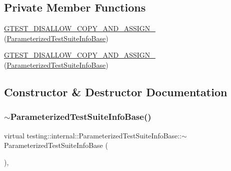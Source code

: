 \subsection*{Private Member Functions}
\begin{DoxyCompactItemize}
\item 
\mbox{\hyperlink{classtesting_1_1internal_1_1_parameterized_test_suite_info_base_a49431b7df609223c2a7fea67367e1d00}{G\+T\+E\+S\+T\+\_\+\+D\+I\+S\+A\+L\+L\+O\+W\+\_\+\+C\+O\+P\+Y\+\_\+\+A\+N\+D\+\_\+\+A\+S\+S\+I\+G\+N\+\_\+}} (\mbox{\hyperlink{classtesting_1_1internal_1_1_parameterized_test_suite_info_base}{Parameterized\+Test\+Suite\+Info\+Base}})
\item 
\mbox{\hyperlink{classtesting_1_1internal_1_1_parameterized_test_suite_info_base_a49431b7df609223c2a7fea67367e1d00}{G\+T\+E\+S\+T\+\_\+\+D\+I\+S\+A\+L\+L\+O\+W\+\_\+\+C\+O\+P\+Y\+\_\+\+A\+N\+D\+\_\+\+A\+S\+S\+I\+G\+N\+\_\+}} (\mbox{\hyperlink{classtesting_1_1internal_1_1_parameterized_test_suite_info_base}{Parameterized\+Test\+Suite\+Info\+Base}})
\end{DoxyCompactItemize}


\subsection{Constructor \& Destructor Documentation}
\mbox{\label{classtesting_1_1internal_1_1_parameterized_test_suite_info_base_ac2aa0664f56e84cacab823d345c7d67b}} 
\subsubsection{\texorpdfstring{$\sim$ParameterizedTestSuiteInfoBase()}{~ParameterizedTestSuiteInfoBase()}\hspace{0.1cm}{\footnotesize\ttfamily [1/2]}}
{\footnotesize\ttfamily virtual testing\+::internal\+::\+Parameterized\+Test\+Suite\+Info\+Base\+::$\sim$\+Parameterized\+Test\+Suite\+Info\+Base (\begin{DoxyParamCaption}{ }\end{DoxyParamCaption})\hspace{0.3cm}{\ttfamily [inline]}, {\ttfamily [virtual]}}

